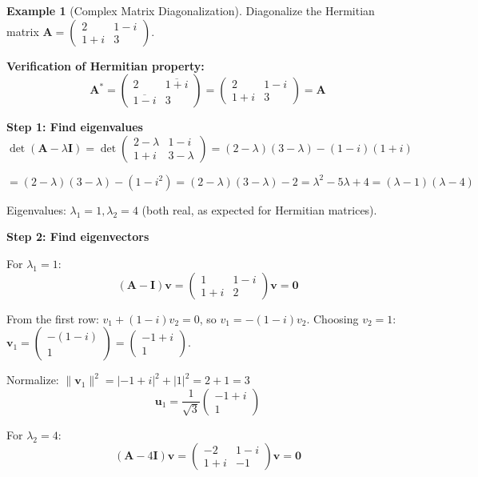 \documentclass[12pt]{article}
\numberwithin{equation}{section}
\newcommand{\vect}[1]{\boldsymbol{#1}}   %
\newcommand{\mat}[1]{\mathbf{#1}}        %
\theoremstyle{plain}
\theoremstyle{definition}
\newtheorem{example}[theorem]{Example}
\theoremstyle{remark}
\begin{document}
\begin{example}[Complex Matrix Diagonalization]
Diagonalize the Hermitian matrix $\mat{A} = \begin{pmatrix} 2 & 1-i \\ 1+i & 3 \end{pmatrix}$.

\textbf{Verification of Hermitian property:}
$$\mat{A}^* = \begin{pmatrix} 2 & \overline{1+i} \\ \overline{1-i} & 3 \end{pmatrix} = \begin{pmatrix} 2 & 1-i \\ 1+i & 3 \end{pmatrix} = \mat{A}$$ \checkmark

\textbf{Step 1: Find eigenvalues}
$$\det(\mat{A} - \lambda\mat{I}) = \det\begin{pmatrix} 2-\lambda & 1-i \\ 1+i & 3-\lambda \end{pmatrix} = (2-\lambda)(3-\lambda) - (1-i)(1+i)$$

$$= (2-\lambda)(3-\lambda) - (1-i^2) = (2-\lambda)(3-\lambda) - 2 = \lambda^2 - 5\lambda + 4 = (\lambda-1)(\lambda-4)$$

Eigenvalues: $\lambda_1 = 1, \lambda_2 = 4$ (both real, as expected for Hermitian matrices).

\textbf{Step 2: Find eigenvectors}

For $\lambda_1 = 1$:
$$(\mat{A} - \mat{I})\vect{v} = \begin{pmatrix} 1 & 1-i \\ 1+i & 2 \end{pmatrix}\vect{v} = \vect{0}$$

From the first row: $v_1 + (1-i)v_2 = 0$, so $v_1 = -(1-i)v_2$.
Choosing $v_2 = 1$: $\vect{v}_1 = \begin{pmatrix} -(1-i) \\ 1 \end{pmatrix} = \begin{pmatrix} -1+i \\ 1 \end{pmatrix}$.

Normalize: $\|\vect{v}_1\|^2 = |-1+i|^2 + |1|^2 = 2 + 1 = 3$
$$\vect{u}_1 = \frac{1}{\sqrt{3}}\begin{pmatrix} -1+i \\ 1 \end{pmatrix}$$

For $\lambda_2 = 4$:
$$(\mat{A} - 4\mat{I})\vect{v} = \begin{pmatrix} -2 & 1-i \\ 1+i & -1 \end{pmatrix}\vect{v} = \vect{0}$$


\end{example}
\end{document}

